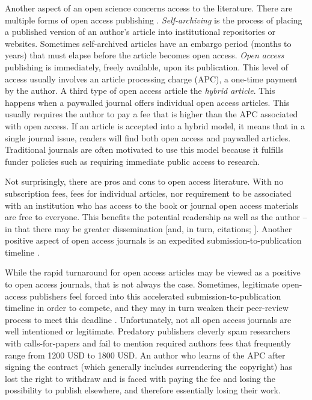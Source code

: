 \documentclass[
  11pt,
]{book}
\begin{document}
Another aspect of an open science concerns access to the literature. There are multiple forms of open access publishing \citep{bezjak_open_2018, shah_open_2017}. \emph{Self-archiving} is the process of placing a published version of an author's article into institutional repositories or websites. Sometimes self-archived articles have an embargo period (months to years) that must elapse before the article becomes open access. \emph{Open access} publishing is immediately, freely available, upon its publication. This level of access usually involves an article processing charge (APC), a one-time payment by the author. A third type of open access article the \emph{hybrid article}. This happens when a paywalled journal offers individual open access articles. This usually requires the author to pay a fee that is higher than the APC associated with open access. If an article is accepted into a hybrid model, it means that in a single journal issue, readers will find both open access and paywalled articles. Traditional journals are often motivated to use this model because it fulfills funder policies such as requiring immediate public access to research.

Not surprisingly, there are pros and cons to open access literature. With no subscription fees, fees for individual articles, nor requirement to be associated with an institution who has access to the book or journal \citep{bezjak_open_2018, shah_open_2017} open access materials are free to everyone. This benefits the potential readership as well as the author -- in that there may be greater dissemination {[}and, in turn, citations; \citet{hagger_developing_2022}{]}. Another positive aspect of open access journals is an expedited submission-to-publication timeline \citep{shah_open_2017}.

While the rapid turnaround for open access articles may be viewed as a positive to open access journals, that is not always the case. Sometimes, legitimate open-access publishers feel forced into this accelerated submission-to-publication timeline in order to compete, and they may in turn weaken their peer-review process to meet this deadline \citep{beall_predatory_2012}. Unfortunately, not all open access journals are well intentioned or legitimate. Predatory publishers cleverly spam researchers with calls-for-papers and fail to mention required authors fees that frequently range from 1200 USD to 1800 USD. An author who learns of the APC after signing the contract (which generally includes surrendering the copyright) has lost the right to withdraw and is faced with paying the fee and losing the possibility to publish elsewhere, and therefore essentially losing their work.
\end{document}
